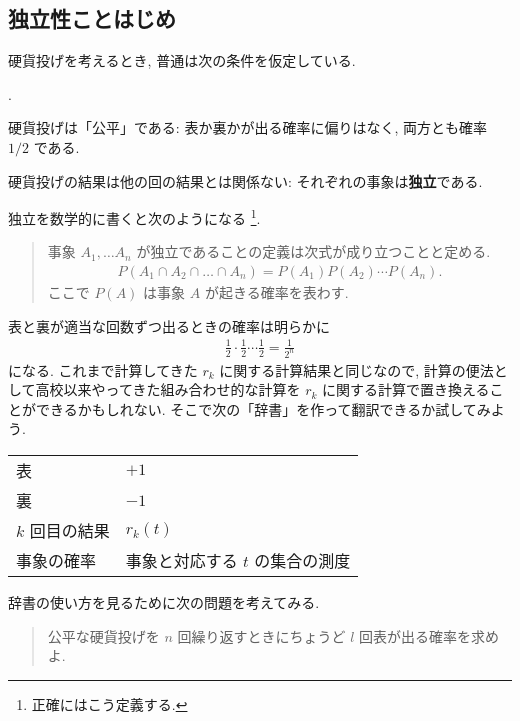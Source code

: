 \documentclass[openany, a4paper, oneside]{jsbook}
\newcounter{enum2}
\renewenvironment{enumerate}{%
\begin{list}%
{%
\arabic{enum2}.\ \,%
}%
{%
\usecounter{enum2}
\setlength{\itemindent}{0pt}%
\setlength{\leftmargin}{15pt}%
\setlength{\rightmargin}{0pt}%
\setlength{\labelsep}{0pt}%
\setlength{\labelwidth}{6pt}%
\setlength{\itemsep}{0pt}%
\setlength{\parsep}{0pt}%
\setlength{\listparindent}{0pt}%
}
}{%
\end{list}%
}
\theoremstyle{break}
\theoremstyle{breakdefn}
\begin{document}
\subsection{独立性ことはじめ \label{Hinashiro_math_party_1_probability_13}}


硬貨投げを考えるとき, 普通は次の条件を仮定している.
\begin{enumerate}
\item 硬貨投げは「公平」である: 表か裏かが出る確率に偏りはなく, 両方とも確率 $1/2$ である.
\item 硬貨投げの結果は他の回の結果とは関係ない: それぞれの事象は\textbf{独立}である.
\end{enumerate}
独立を数学的に書くと次のようになる \footnote{正確にはこう定義する.
 }.
\begin{quote}
事象 $A_1, \dots A_n$ が独立であることの定義は次式が成り立つことと定める.
\begin{align}
 P (A_1 \cap A_2 \cap \dots \cap A_n)
 =
 P (A_1) P (A_2) \cdots P (A_n).
\end{align}
ここで $P (A)$ は事象 $A$ が起きる確率を表わす.
\end{quote}

表と裏が適当な回数ずつ出るときの確率は明らかに
\begin{align}
 \frac{1}{2} \cdot \frac{1}{2} \cdots \frac{1}{2}
 =
 \frac{1}{2^n}
\end{align}
になる.
これまで計算してきた $r_k$ に関する計算結果と同じなので,
計算の便法として高校以来やってきた組み合わせ的な計算を $r_k$ に関する計算で置き換えることができるかもしれない.
そこで次の「辞書」を作って翻訳できるか試してみよう.

\begin{center}
\begin{tabular}{ll}
 表              &  $+1$                             \\
 裏              &  $-1$                             \\
 $k$ 回目の結果  &  $r_k (t)$                        \\
 事象の確率      &  事象と対応する $t$ の集合の測度  \\
\end{tabular}
\end{center}


辞書の使い方を見るために次の問題を考えてみる.
\begin{quote}
公平な硬貨投げを $n$ 回繰り返すときにちょうど $l$ 回表が出る確率を求めよ.
\end{quote}
\end{document}
